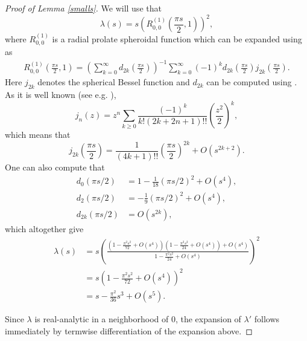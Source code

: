 \documentclass[11pt, a4paper, reqno]{amsart}
\theoremstyle{remark}
\begin{document}
\begin{proof}[Proof of Lemma \ref{smalls}]
    We will use that 
    $$\lambda(s) = s \left(R_{0,0}^{(1)}\left(\frac{\pi s}{2},1\right)\right)^2,$$
    where $R_{0,0}^{(1)}$ is a radial prolate spheroidal function which can be expanded using \cite[eq. (15.3.5)]{Zhang} as
    \begin{align*}
        R_{0,0}^{(1)}\left(\frac{\pi s}{2},1\right) = \left(\sum_{k=0}^{\infty}d_{2k}\left(\frac{\pi s}{2}\right)\right)^{-1} \sum_{k=0}^{\infty} (-1)^k d_{2k}\left(\frac{\pi s}{2}\right)j_{2k}\left(\frac{\pi s}{2}\right).
    \end{align*}
    Here $j_{2k}$ denotes the spherical Bessel function and $d_{2k}$ can be computed using \cite[eq. (15.4.7)]{Zhang}.
    As it is well known (see e.g. \cite{SphericalBessel}), 
    $$j_{n}(z) = z^n \sum_{k\geq 0}\frac{(-1)^k}{k! (2k+2n+1)!!}\left(\frac{z^2}{2}\right)^k,$$
    which means that 
    $$j_{2k}\left(\frac{\pi s}{2}\right) = \frac{1}{(4k+1)!!}\left(\frac{\pi s}{2}\right)^{2k} + O\left(s^{2k+2}\right).$$
    One can also compute that 
    \begin{align*}
        d_0(\pi s/2) &= 1 - \frac{1}{18}(\pi s/2)^2 + O(s^4), \\
        d_2(\pi s/2) &= -\frac{1}{9}(\pi s/2)^2 + O(s^4), \\
        d_{2k}(\pi s/2) &= O(s^{2k}),
    \end{align*}
    which altogether give
    \begin{align*}
        \lambda(s) &= s\left(\frac{(1 - \frac{\pi^2 s^2}{72} + O(s^4))(1-\frac{\pi^2 s^2}{24}+O(s^4)) + O(s^4)}{1-\frac{\pi^2 s^2}{24} + O(s^4)}\right)^2 \\
        &= s\left(1 - \frac{\pi^2 s^2}{72} + O(s^4)\right)^2 \\
        &= s- \frac{\pi^2}{36}s^3 + O(s^5).
    \end{align*}

    Since \(\lambda\) is real-analytic in a neighborhood of \(0\), the expansion of \(\lambda'\) follows immediately by termwise differentiation of the expansion above. 
\end{proof}
\end{document}
